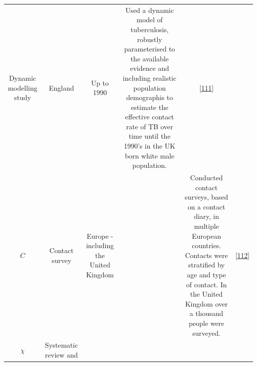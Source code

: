 \documentclass[11pt,twoside]{bristolthesis}
\begin{document}
\begin{longtable}[]{@{}cccccc@{}}
\begin{minipage}[t]{0.10\columnwidth}
  Dynamic
  modelling
  study\strut
  \end{minipage} & \begin{minipage}[t]{0.07\columnwidth}\centering
  England\strut
  \end{minipage} & \begin{minipage}[t]{0.07\columnwidth}\centering
  Up to
  1990\strut
  \end{minipage} & \begin{minipage}[t]{0.27\columnwidth}\centering
  Used a dynamic model of tuberculosis,
  robustly parameterised to the available
  evidence and including realistic
  population demographis to estimate the
  effective contact rate of TB over time
  until the 1990's in the UK born white
  male population.\strut
  \end{minipage} & \begin{minipage}[t]{0.11\columnwidth}\centering
  {[}\protect\hyperlink{ref-Vynnycky1999}{111}{]}\strut
  \end{minipage}\tabularnewline
  \begin{minipage}[t]{0.21\columnwidth}\centering
  \(C\)\strut
  \end{minipage} & \begin{minipage}[t]{0.10\columnwidth}\centering
  Contact
  survey\strut
  \end{minipage} & \begin{minipage}[t]{0.07\columnwidth}\centering
  Europe -
  including
  the
  United
  Kingdom\strut
  \end{minipage} & \begin{minipage}[t]{0.07\columnwidth}\centering
  2005\strut
  \end{minipage} & \begin{minipage}[t]{0.27\columnwidth}\centering
  Conducted contact surveys, based on a
  contact diary, in multiple European
  countries. Contacts were stratified by
  age and type of contact. In the United
  Kingdom over a thousand people were
  surveyed.\strut
  \end{minipage} & \begin{minipage}[t]{0.11\columnwidth}\centering
  {[}\protect\hyperlink{ref-Mossong2008}{112}{]}\strut
  \end{minipage}\tabularnewline
  \begin{minipage}[t]{0.21\columnwidth}\centering
  \(\chi\)\strut
  \end{minipage} & \begin{minipage}[t]{0.10\columnwidth}\centering
  Systematic
  review and

\end{minipage}
\end{longtable}
\end{document}
